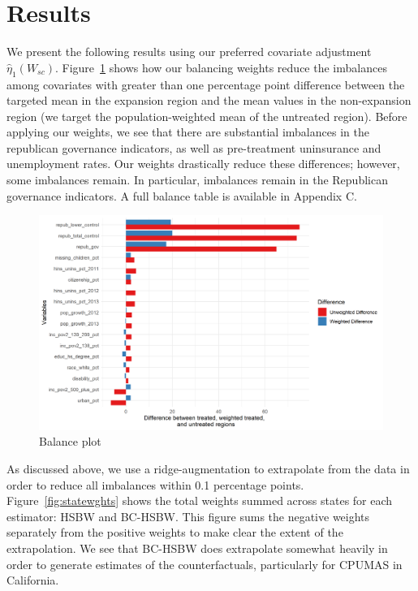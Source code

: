 \documentclass[12pt]{article}
\begin{document}
\section{Results}

We present the following results using our preferred covariate adjustment $\hat{\eta}_1(W_{sc})$.  Figure~\ref{fig:loveplot} shows how our balancing weights reduce the imbalances among covariates with greater than one percentage point difference between the targeted mean in the expansion region and the mean values in the non-expansion region (we target the population-weighted mean of the untreated region). Before applying our weights, we see that there are substantial imbalances in the republican governance indicators, as well as pre-treatment uninsurance and unemployment rates. Our weights drastically reduce these differences; however, some imbalances remain. In particular, imbalances remain in the Republican governance indicators. A full balance table is available in Appendix C. 

\begin{figure}[B]
\begin{center}
    \includegraphics[scale=0.6]{01_Plots/balance-plot-etu.png}
    \caption{Balance plot}
    \label{fig:loveplot}
\end{center}
\end{figure}

As discussed above, we use a ridge-augmentation to extrapolate from the data in order to reduce all imbalances within 0.1 percentage points. Figure~\ref{fig:statewghts} shows the total weights summed across states for each estimator: HSBW and BC-HSBW. This figure sums the negative weights separately from the positive weights to make clear the extent of the extrapolation. We see that BC-HSBW does extrapolate somewhat heavily in order to generate estimates of the counterfactuals, particularly for CPUMAS in California. 
\end{document}
